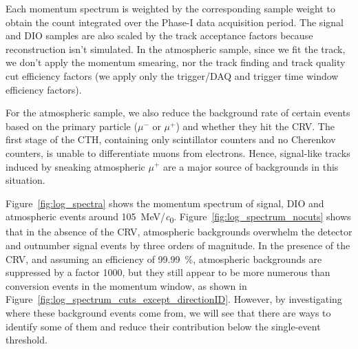 Each momentum spectrum is weighted by the corresponding sample weight to obtain
the count integrated over the Phase-I data acquisition period. The signal and
DIO samples are also scaled by the track acceptance factors because
reconstruction isn't simulated. In the atmospheric sample, since we fit the
track, we don't apply the momentum smearing, nor the track
finding and track quality cut efficiency factors (we apply only the trigger/DAQ
and trigger time window efficiency factors). 

For the atmospheric sample, we also reduce the background rate of certain events
based on the primary particle ($\mu^-$ or $\mu^+$) and whether they hit the CRV.
The first stage of the CTH, containing only scintillator counters and no
Cherenkov counters, is unable to differentiate muons from electrons. Hence,
signal-like tracks induced by sneaking atmospheric $\mu^+$ are a major source of
backgrounds in this situation. 

Figure~\ref{fig:log_spectra} shows the momentum spectrum of signal, DIO and
atmospheric events around \SI{105}{\MeV/\clight}.
Figure~\ref{fig:log_spectrum_nocuts} shows that in the absence of the CRV,
atmospheric backgrounds overwhelm the detector and outnumber signal events by
three orders of magnitude. In the presence of the CRV, and assuming an
efficiency of \SI{99.99}{\percent}, atmospheric backgrounds are suppressed by a
factor 1000, but they still appear to be more numerous than conversion events in
the momentum window, as shown in
Figure~\ref{fig:log_spectrum_cuts_except_directionID}. However, by investigating
where these background events come from, we will see that there are ways to
identify some of them and reduce their contribution below the single-event
threshold.

